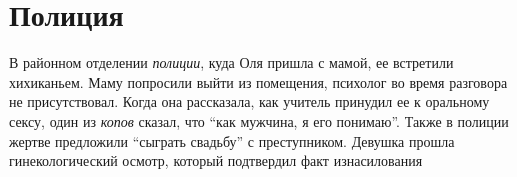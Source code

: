  
 
 
 
 
\chapter{Полиция}

В районном отделении \emph{полиции}, куда Оля пришла с мамой, ее встретили хихиканьем.
Маму попросили выйти из помещения, психолог во время разговора не
присутствовал. Когда она рассказала, как учитель принудил ее к оральному сексу,
один из \emph{копов} сказал, что \enquote{как мужчина, я его понимаю}. Также в полиции жертве
предложили \enquote{сыграть свадьбу} с преступником.  Девушка прошла гинекологический
осмотр, который подтвердил факт изнасилования
